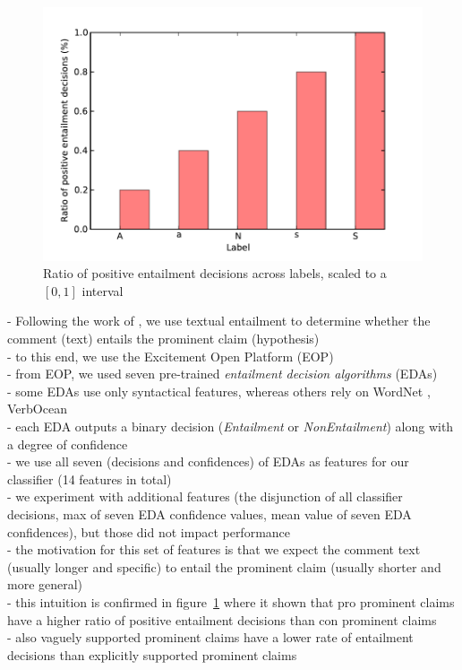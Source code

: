 \begin{figure}
\includegraphics{entailment.pdf}
\caption{Ratio of positive entailment decisions across labels, scaled to a $[0,1]$ interval
}
\label{fig:entailment_ratio}
\end{figure}

- Following the work of \citet{cabrio2012combining}, we use textual 
entailment to determine whether the comment (text) entails the prominent
claim (hypothesis) \\
- to this end, we use the Excitement Open Platform (EOP)
\citep{pado2015design} \\
- from EOP, we used seven pre-trained \textit{entailment decision algorithms}
(EDAs) \\
- some EDAs use only syntactical features, whereas others rely on
WordNet \citep{miller1995wordnet}, VerbOcean \citep{chklovski2004verbocean} \\
- each EDA outputs a binary decision (\textit{Entailment} or \textit{NonEntailment})
along with a degree of confidence \\
- we use all seven (decisions and confidences) of EDAs as features for our classifier 
(14 features in total) \\
- we experiment with additional features (the disjunction of all classifier decisions, 
max of seven EDA confidence values, mean value of seven EDA confidences), but those
did not impact performance \\
- the motivation for this set of features is that we expect the comment text (usually longer and specific)
to entail the prominent claim (usually shorter and more general) \\
- this intuition is confirmed in figure~\ref{fig:entailment_ratio}
where it shown that 
pro prominent claims have a higher ratio of positive entailment decisions than con prominent claims \\
- also vaguely supported prominent claims have a lower rate of entailment
decisions than explicitly supported prominent claims \\

